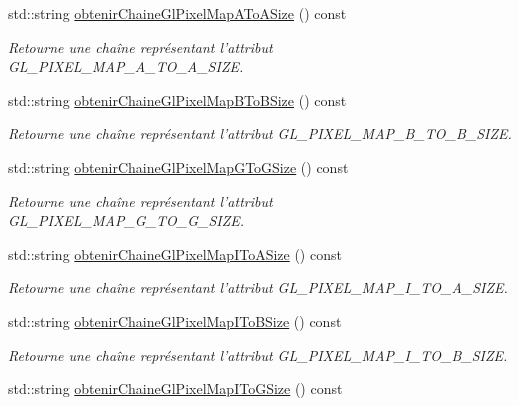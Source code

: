 \begin{DoxyCompactItemize}
std\-::string \hyperlink{group__utilitaire_ga6d92a97f95de6e5eb298d27c342a4375}{obtenir\-Chaine\-Gl\-Pixel\-Map\-A\-To\-A\-Size} () const 
\begin{DoxyCompactList}\small\item\em Retourne une chaîne représentant l'attribut G\-L\-\_\-\-P\-I\-X\-E\-L\-\_\-\-M\-A\-P\-\_\-\-A\-\_\-\-T\-O\-\_\-\-A\-\_\-\-S\-I\-Z\-E. \end{DoxyCompactList}\item 
std\-::string \hyperlink{group__utilitaire_ga554e72e1ef666b6dca527a1073219c9e}{obtenir\-Chaine\-Gl\-Pixel\-Map\-B\-To\-B\-Size} () const 
\begin{DoxyCompactList}\small\item\em Retourne une chaîne représentant l'attribut G\-L\-\_\-\-P\-I\-X\-E\-L\-\_\-\-M\-A\-P\-\_\-\-B\-\_\-\-T\-O\-\_\-\-B\-\_\-\-S\-I\-Z\-E. \end{DoxyCompactList}\item 
std\-::string \hyperlink{group__utilitaire_gad80ac227ca04522df384be1e0f93b546}{obtenir\-Chaine\-Gl\-Pixel\-Map\-G\-To\-G\-Size} () const 
\begin{DoxyCompactList}\small\item\em Retourne une chaîne représentant l'attribut G\-L\-\_\-\-P\-I\-X\-E\-L\-\_\-\-M\-A\-P\-\_\-\-G\-\_\-\-T\-O\-\_\-\-G\-\_\-\-S\-I\-Z\-E. \end{DoxyCompactList}\item 
std\-::string \hyperlink{group__utilitaire_gadadb89e110f09aaf815829f028ab539d}{obtenir\-Chaine\-Gl\-Pixel\-Map\-I\-To\-A\-Size} () const 
\begin{DoxyCompactList}\small\item\em Retourne une chaîne représentant l'attribut G\-L\-\_\-\-P\-I\-X\-E\-L\-\_\-\-M\-A\-P\-\_\-\-I\-\_\-\-T\-O\-\_\-\-A\-\_\-\-S\-I\-Z\-E. \end{DoxyCompactList}\item 
std\-::string \hyperlink{group__utilitaire_ga8fac55d9d77a0b119c7247536471b5fe}{obtenir\-Chaine\-Gl\-Pixel\-Map\-I\-To\-B\-Size} () const 
\begin{DoxyCompactList}\small\item\em Retourne une chaîne représentant l'attribut G\-L\-\_\-\-P\-I\-X\-E\-L\-\_\-\-M\-A\-P\-\_\-\-I\-\_\-\-T\-O\-\_\-\-B\-\_\-\-S\-I\-Z\-E. \end{DoxyCompactList}\item 
std\-::string \hyperlink{group__utilitaire_gaa449af86fad19dad37eea16a918b3c33}{obtenir\-Chaine\-Gl\-Pixel\-Map\-I\-To\-G\-Size} () const 

\end{DoxyCompactItemize}
